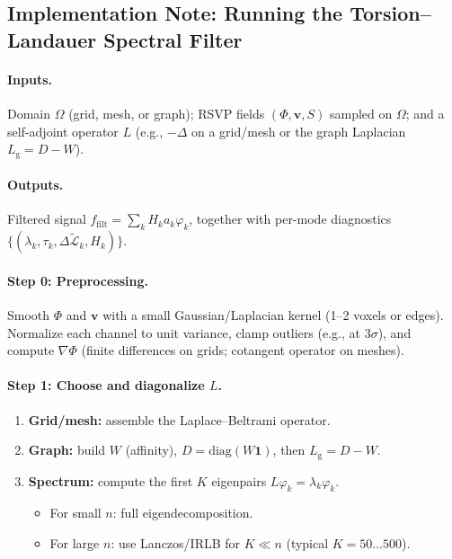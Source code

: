 \documentclass[a4paper,11pt]{article}
\begin{document}
\subsection{Implementation Note: Running the Torsion--Landauer Spectral Filter}
\label{sec:impl-spectral}

\paragraph{Inputs.} Domain $\Omega$ (grid, mesh, or graph); RSVP fields
$(\Phi,\mathbf v,S)$ sampled on $\Omega$; and a self-adjoint operator $L$
(e.g., $-\Delta$ on a grid/mesh or the graph Laplacian
$L_{\mathrm g}=D-W$).

\paragraph{Outputs.} Filtered signal
$f_{\mathrm{filt}}=\sum_k H_k a_k \varphi_k$, together with per-mode
diagnostics
$\{(\lambda_k,\tau_k,\Delta\widetilde{\mathcal{L}}_k,H_k)\}$.

\paragraph{Step 0: Preprocessing.}
Smooth $\Phi$ and $\mathbf v$ with a small Gaussian/Laplacian kernel
(1--2 voxels or edges). Normalize each channel to unit variance, clamp
outliers (e.g., at $3\sigma$), and compute $\nabla\Phi$ (finite differences
on grids; cotangent operator on meshes).

\paragraph{Step 1: Choose and diagonalize $L$.}
\begin{enumerate}
\item \textbf{Grid/mesh:} assemble the Laplace--Beltrami operator.
\item \textbf{Graph:} build $W$ (affinity), $D=\mathrm{diag}(W\mathbf{1})$,
then $L_{\mathrm g}=D-W$.
\item \textbf{Spectrum:} compute the first $K$ eigenpairs
$L\varphi_k=\lambda_k\varphi_k$.
  \begin{itemize}
  \item For small $n$: full eigendecomposition.
  \item For large $n$: use Lanczos/IRLB for $K\!\ll\!n$
  (typical $K=50\ldots500$).
  \end{itemize}
\end{enumerate}
\end{document}
